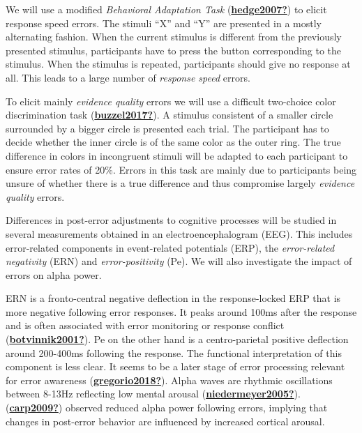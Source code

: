 \documentclass[
  man,floatsintext]{apa7}
\begin{document}
We will use a modified \emph{Behavioral Adaptation Task} (\protect\hyperlink{ref-hedge2007}{\textbf{hedge2007?}}) to elicit response speed errors. The stimuli ``X'' and ``Y'' are presented in a mostly alternating fashion. When the current stimulus is different from the previously presented stimulus, participants have to press the button corresponding to the stimulus. When the stimulus is repeated, participants should give no response at all. This leads to a large number of \emph{response speed} errors.

To elicit mainly \emph{evidence quality} errors we will use a difficult two-choice color discrimination task (\protect\hyperlink{ref-buzzel2017}{\textbf{buzzel2017?}}). A stimulus consistent of a smaller circle surrounded by a bigger circle is presented each trial. The participant has to decide whether the inner circle is of the same color as the outer ring. The true difference in colors in incongruent stimuli will be adapted to each participant to ensure error rates of 20\%. Errors in this task are mainly due to participants being unsure of whether there is a true difference and thus compromise largely \emph{evidence quality} errors.

Differences in post-error adjustments to cognitive processes will be studied in several measurements obtained in an electroencephalogram (EEG). This includes error-related components in event-related potentials (ERP), the \emph{error-related negativity} (ERN) and \emph{error-positivity} (Pe). We will also investigate the impact of errors on alpha power.

ERN is a fronto-central negative deflection in the response-locked ERP that is more negative following error responses. It peaks around 100ms after the response and is often associated with error monitoring or response conflict (\protect\hyperlink{ref-botvinnik2001}{\textbf{botvinnik2001?}}).
Pe on the other hand is a centro-parietal positive deflection around 200-400ms following the response. The functional interpretation of this component is less clear. It seems to be a later stage of error processing relevant for error awareness (\protect\hyperlink{ref-gregorio2018}{\textbf{gregorio2018?}}).
Alpha waves are rhythmic oscillations between 8-13Hz reflecting low mental arousal (\protect\hyperlink{ref-niedermeyer2005}{\textbf{niedermeyer2005?}}). (\protect\hyperlink{ref-carp2009}{\textbf{carp2009?}}) observed reduced alpha power following errors, implying that changes in post-error behavior are influenced by increased cortical arousal.
\end{document}
